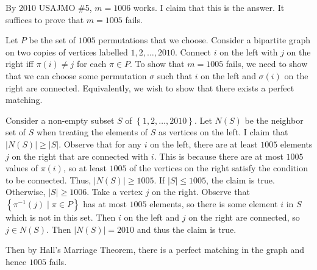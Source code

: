 By 2010 USAJMO \#5, $m=1006$ works. I claim that this is the answer. It suffices to prove that $m=1005$ fails.

Let $P$ be the set of $1005$ permutations that we choose. Consider a bipartite graph on two copies of vertices labelled $1,2,\ldots,2010$. Connect $i$ on the left with $j$ on the right iff $\pi\left(i\right)\neq j$ for each $\pi\in P$. To show that $m=1005$ fails, we need to show that we can choose some permutation $\sigma$ such that $i$ on the left and $\sigma\left(i\right)$ on the right are connected. Equivalently, we wish to show that there exists a perfect matching.

Consider a non-empty subset $S$ of $\left\{1,2,\ldots,2010\right\}$. Let $N\left(S\right)$ be the neighbor set of $S$ when treating the elements of $S$ as vertices on the left. I claim that $\left|N\left(S\right)\right|\geq\left|S\right|$. Observe that for any $i$ on the left, there are at least $1005$ elements $j$ on the right that are connected with $i$. This is because there are at most $1005$ values of $\pi\left(i\right)$, so at least $1005$ of the vertices on the right satisfy the condition to be connected. Thus, $\left|N\left(S\right)\right|\geq1005$. If $\left|S\right|\leq1005$, the claim is true. Otherwise, $\left|S\right|\geq1006$. Take a vertex $j$ on the right. Observe that $\left\{\pi^{-1}\left(j\right)\mid\pi\in P\right\}$ has at most $1005$ elements, so there is some element $i$ in $S$ which is not in this set. Then $i$ on the left and $j$ on the right are connected, so $j\in N\left(S\right)$. Then $\left|N\left(S\right)\right|=2010$ and thus the claim is true.

Then by Hall's Marriage Theorem, there is a perfect matching in the graph and hence $1005$ fails.